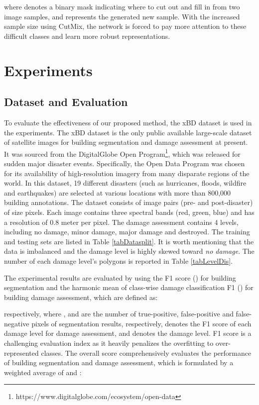 \documentclass[journal]{IEEEtran}
\begin{document}
where  denotes a binary mask indicating where to cut out and fill in from two image samples,  and  represents the generated new sample. With the increased sample size using CutMix, the network is forced to pay more attention to these difficult classes and learn more robust representations.




\section{Experiments}
\label{SecExp}
\subsection{Dataset and Evaluation}
To evaluate the effectiveness of our proposed method, the xBD dataset \cite{gupta2019xbd} is used in the experiments. The xBD dataset is the only public available large-scale dataset of satellite images for building segmentation and damage assessment at present. It was sourced from the DigitalGlobe Open Program\footnote{https://www.digitalglobe.com/ecosystem/open-data}, which was released for sudden major disaster events. Specifically, the Open Data Program was chosen for its availability of high-resolution imagery from many disparate regions of the world. In this dataset, 19 different disasters (such as hurricanes, floods, wildfire and earthquakes) are selected at various locations with more than 800,000 building annotations. The dataset consists of image pairs (pre- and post-disaster) of size  pixels. Each image contains three spectral bands (red, green, blue) and has a resolution of 0.8 meter per pixel. The damage assessment contains 4 levels, including no damage, minor damage, major damage and destroyed. The training and testing sets are listed in Table \ref{tabDatasplit}. It is worth mentioning that the data is imbalanced and the damage level is highly skewed toward \textit{no damage}. The number of each damage level's polygons is reported in Table \ref{tabLevelDis}.

The experimental results are evaluated by using the F1 score () for building segmentation  and the harmonic mean of class-wise damage classification F1 () for building damage assessment, which are defined as:

respectively, where ,  and  are the number of true-positive, false-positive and false-negative pixels of segmentation results, respectively,  denotes the F1 score of each damage level for damage assessment, and  denotes the damage level. F1 score is a challenging evaluation index as it heavily penalizes the overfitting to over-represented classes. The overall score  \cite{gupta2019xbd} comprehensively evaluates the performance of building segmentation and damage assessment, which
is formulated by a weighted average of  and :
\end{document}
